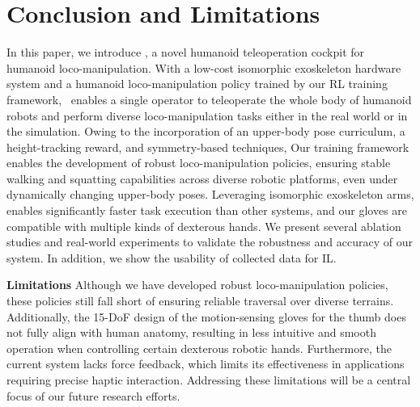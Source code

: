 \section{Conclusion and Limitations}
In this paper, we introduce \ourshort, a novel humanoid teleoperation cockpit for humanoid loco-manipulation. With a low-cost isomorphic exoskeleton hardware system and a humanoid loco-manipulation policy trained by our RL training framework, ~\ourshort enables a single operator to teleoperate the whole body of humanoid robots and perform diverse loco-manipulation tasks either in the real world or in the simulation. Owing to the incorporation of an upper-body pose curriculum, a height-tracking reward, and symmetry-based techniques, Our training framework enables the development of robust loco-manipulation policies, ensuring stable walking and squatting capabilities across diverse robotic platforms, even under dynamically changing upper-body poses. Leveraging isomorphic exoskeleton arms, \ourshort enables significantly faster task execution than other systems, and our gloves are compatible with multiple kinds of dexterous hands. We present several ablation studies and real-world experiments to validate the robustness and accuracy of our system. In addition, we show the usability of collected data for IL.

\textbf{Limitations} Although we have developed robust loco-manipulation policies, these policies still fall short of ensuring reliable traversal over diverse terrains. Additionally, the 15-DoF design of the motion-sensing gloves for the thumb does not fully align with human anatomy, resulting in less intuitive and smooth operation when controlling certain dexterous robotic hands. Furthermore, the current system lacks force feedback, which limits its effectiveness in applications requiring precise haptic interaction. Addressing these limitations will be a central focus of our future research efforts.
